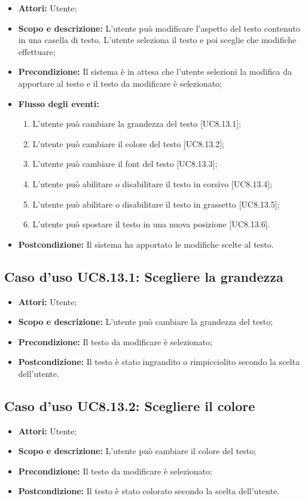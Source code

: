 \begin{itemize}
	\item \textbf{Attori:} Utente;
	\item \textbf{Scopo e descrizione:} L'utente può modificare l'aspetto del testo contenuto in una casella di testo. L'utente seleziona il testo e poi sceglie che modifiche effettuare;
	\item \textbf{Precondizione:} Il sistema è in attesa che l'utente selezioni la modifica da apportare al testo e il testo da modificare è selezionato;
	\item \textbf{Flusso degli eventi:}
	\begin{enumerate}
		\item L'utente può cambiare la grandezza del testo [UC8.13.1];
		\item L'utente può cambiare il colore del testo [UC8.13.2];
		\item L'utente può cambiare il font del testo [UC8.13.3];
		\item L'utente può abilitare o disabilitare il testo in corsivo [UC8.13.4];
		\item L'utente può abilitare o disabilitare il testo in grassetto [UC8.13.5];
		\item L'utente può spostare il testo in una nuova posizione [UC8.13.6].
	\end{enumerate}
	\item \textbf{Postcondizione:} Il sistema ha apportato le modifiche scelte al testo.
\end{itemize}

\subsection{Caso d'uso UC8.13.1: Scegliere la grandezza}
\begin{itemize}
	\item \textbf{Attori:} Utente;
	\item \textbf{Scopo e descrizione:} L'utente può cambiare la grandezza del testo;
	\item \textbf{Precondizione:} Il testo da modificare è selezionato;
	\item \textbf{Postcondizione:} Il testo è stato ingrandito o rimpicciolito secondo la scelta dell'utente.
\end{itemize}

\subsection{Caso d'uso UC8.13.2: Scegliere il colore}
\begin{itemize}
	\item \textbf{Attori:} Utente;
	\item \textbf{Scopo e descrizione:} L'utente può cambiare il colore del testo;
	\item \textbf{Precondizione:} Il testo da modificare è selezionato;
	\item \textbf{Postcondizione:} Il testo è stato colorato secondo la scelta dell'utente.
\end{itemize}

